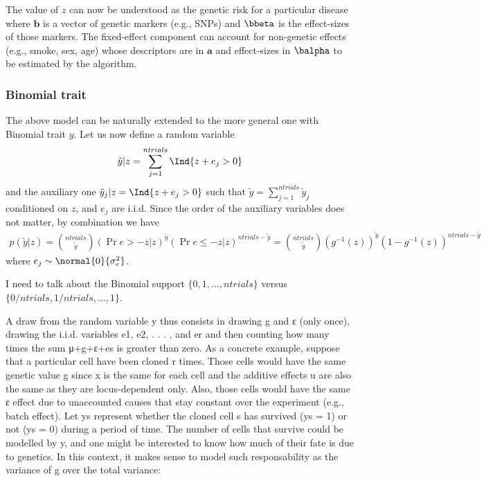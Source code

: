 The value of $z$ can now be understood as the genetic risk for a particular disease where $\mathbf b$ is a vector of genetic markers (e.g., SNPs) and $\bbeta$ is the effect-sizes of those markers. The fixed-effect component can account for non-genetic effects (e.g., smoke, sex, age) whose descriptors are in $\mathbf a$ and effect-sizes in $\balpha$ to be estimated by the algorithm.

\subsubsection{Binomial trait}

The above model can be naturally extended to the more general one with Binomial trait $y$. Let us now define a random variable
\begin{align*}
\tilde y | z = \sum_{j=1}^{ntrials} \Ind{z+e_j > 0}
\end{align*}
and the auxiliary one $\tilde y_j | z = \Ind{z+e_j > 0}$ such that $\tilde y = \sum_{j=1}^{ntrials} \tilde y_j$ conditioned on $z$, and $e_j$ are i.i.d. Since the order of the auxiliary variables does not matter, by combination we have
\begin{align*}
p(\tilde y|z) = {ntrials \choose \tilde y} (\Pr{e > -z|z})^{\tilde y} (\Pr{e \leq -z|z})^{ntrials - \tilde y} =
	{ntrials \choose \tilde y} (g^{-1}(z))^{\tilde y} (1-g^{-1}(z))^{ntrials - \tilde y}
\end{align*}
where $e_j \sim \normal{0}{\sigma_e^2}$.

I need to talk about the Binomial support $\{0, 1, \dots, ntrials\}$ versus $\{0/ntrials, 1/ntrials, \dots, 1\}$.

A draw from the random variable y thus consists in drawing g and ε (only once), drawing
the i.i.d. variables e1, e2, . . . , and er and then counting how many times the sum μ+g+ε+es
is greater than zero. As a concrete example, suppose that a particular cell have been cloned
r times. Those cells would have the same genetic value g since x is the same for each cell
and the additive effects u are also the same as they are locus-dependent only. Also, those
cells would have the same ε effect due to unaccounted causes that stay constant over the
experiment (e.g., batch effect). Let ys represent whether the cloned cell s has survived
(ys = 1) or not (ys = 0) during a period of time. The number of cells that survive could
be modelled by y, and one might be interested to know how much of their fate is due to
genetics. In this context, it makes sense to model such responsability as the variance of g
over the total variance:

